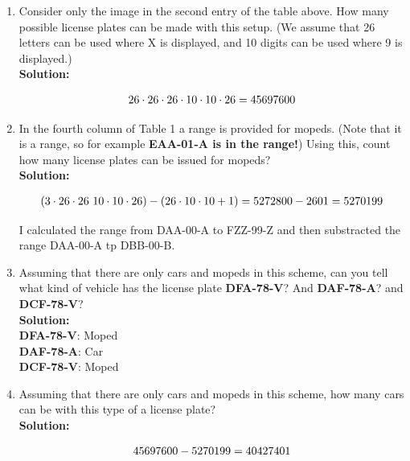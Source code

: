 \documentclass[a4paper]{article}
\begin{document}
\begin{enumerate}
\begin{enumerate}
	\item Consider only the image in the second entry of the table above. How many possible license plates can be made with this setup. (We assume that 26 letters can be used where X is displayed, and 10 digits can be used where 9 is displayed.)\\
	\textbf{Solution:}


\begin{align}
26 \cdot 26 \cdot 26 \cdot 10 \cdot 10 \cdot 26 = 45697600\notag
\end{align}

	
	\item In the fourth column of Table 1 a range is provided for mopeds. (Note that it is a range, so for example \textbf{EAA-01-A is in the range!}) Using this, count how many license plates can be issued for mopeds?\\
	\textbf{Solution:}

\begin{align}
(3 \cdot 26 \cdot 26 \ 10 \cdot 10 \cdot 26) - (26 \cdot 10 \cdot 10 + 1) = 5272800 - 2601 = 5270199\notag
\end{align}

I calculated the range from DAA-00-A to FZZ-99-Z and then substracted the range DAA-00-A tp DBB-00-B.\\

	
	\item Assuming that there are only cars and mopeds in this scheme, can you tell what kind of vehicle has the license plate \textbf{DFA-78-V}? And \textbf{DAF-78-A}? and \textbf{DCF-78-V}?\\
	\textbf{Solution:}\\	
	
\textbf{DFA-78-V}: Moped\\
\textbf{DAF-78-A}: Car\\
\textbf{DCF-78-V}: Moped\\

	
	
	\item Assuming that there are only cars and mopeds in this scheme, how many cars can be with this type of a license plate?\\
	\textbf{Solution:}	

\begin{align}
45697600 - 5270199 = 40427401\notag
\end{align}





\end{enumerate}
\end{enumerate}
\end{document}
